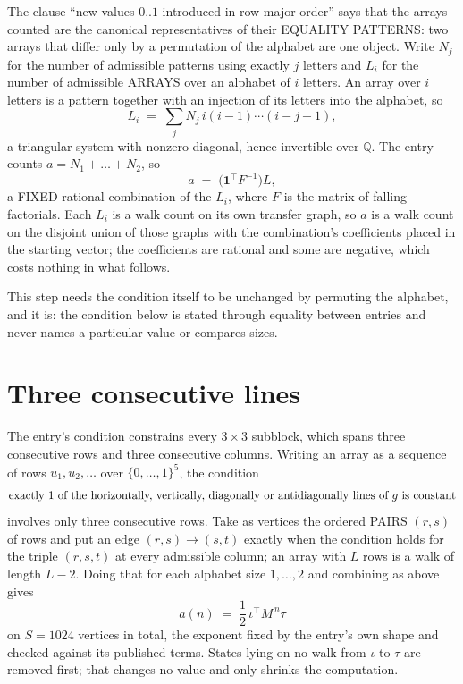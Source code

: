 \documentclass[11pt,a4paper]{article}
\theoremstyle{plain}
\theoremstyle{definition}
\begin{document}
The clause ``new values $0..1$ introduced in row major order'' says that the arrays
counted are the canonical representatives of their EQUALITY PATTERNS: two arrays that differ
only by a permutation of the alphabet are one object. Write $N_j$ for the number of admissible
patterns using exactly $j$ letters and $L_i$ for the number of admissible ARRAYS over an
alphabet of $i$ letters. An array over $i$ letters is a pattern together with an injection of
its letters into the alphabet, so
\[
L_i\;=\;\sum_{j}N_j\,i(i-1)\cdots(i-j+1),
\]
a triangular system with nonzero diagonal, hence invertible over $\mathbb{Q}$. The entry
counts $a=N_1+\dots+N_{2}$, so
\[
a\;=\;\bigl(\mathbf{1}^{\!\top}F^{-1}\bigr)L ,
\]
a FIXED rational combination of the $L_i$, where $F$ is the matrix of falling factorials.
Each $L_i$ is a walk count on its own transfer graph, so $a$ is a walk count on the disjoint
union of those graphs with the combination's coefficients placed in the starting vector; the
coefficients are rational and some are negative, which costs nothing in what follows.

This step needs the condition itself to be unchanged by permuting the alphabet, and it is:
the condition below is stated through equality between entries and never names a particular
value or compares sizes.

\section{Three consecutive lines}

The entry's condition constrains every $3\times3$ subblock, which spans three consecutive
rows and three consecutive columns. Writing an array as a sequence of rows
$u_1,u_2,\dots$ over $\{0,\dots,1\}^{5}$, the condition
\[
\text{exactly }1\text{ of the horizontally, vertically, diagonally or antidiagonally lines of }g\text{ \text{is constant}}
\]
involves only three consecutive rows. Take as vertices the ordered PAIRS $(r,s)$ of
rows and put an edge $(r,s)\to(s,t)$ exactly when the condition holds for the triple
$(r,s,t)$ at every admissible column; an array with $L$ rows is a walk of length $L-2$.
Doing that for each alphabet size $1,\dots,2$ and combining as above gives
\[
a(n)\;=\;\frac{1}{2}\,\iota^{\!\top}M^{\,n}\tau
\]
on $S=1024$ vertices in total, the exponent fixed by the entry's own shape and checked against
its published terms. States lying on no walk from $\iota$ to $\tau$ are removed first; that
changes no value and only shrinks the computation.
\end{document}
